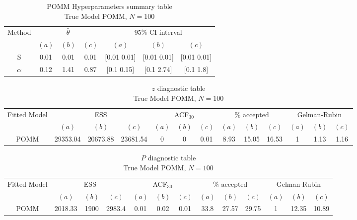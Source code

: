 \documentclass[11pt]{amsart}
\begin{document}
\begin{table}[htbp]
\centering
\caption*{
{\large POMM Hyperparameters summary table} \\ 
{\small True Model POMM, $N=100$}
} 
\begin{tabular}{ccccccc}
\toprule
\multirow{2}{*}{Method} & \multicolumn{3}{c}{
$\hat{\theta}$} & \multicolumn{3}{c}{
95$\%$ CI interval}  \\
\cmidrule(lr){2-4} \cmidrule(lr){5-7} 
& $(a)$ & $(b)$ & $(c)$ & $(a)$ & $(b)$ & $(c)$  \\
\midrule
S  &0.01 & 0.01 & 0.01 & [0.01	0.01] & [0.01	0.01] & [0.01	0.01]   \\
$\alpha$ & 0.12 & 1.41 & 0.87 & [0.1	0.15] & [0.1	2.74] & [0.1	1.8] \\
\bottomrule
\end{tabular}
\label{table:simulations_from_simple}
\end{table}








\begin{table}[htbp]
\centering
\caption*{
{\large $z$ diagnostic table} \\ 
{\small True Model POMM, $N=100$}
} 
\begin{tabular}{ccccccccccccc}
\toprule
\multirow{2}{*}{Fitted Model} & \multicolumn{3}{c}{ESS} & \multicolumn{3}{c}{
ACF$_{30}$} & \multicolumn{3}{c}{$\%$ accepted} & \multicolumn{3}{c}{Gelman-Rubin}\\
\cmidrule(lr){2-4} \cmidrule(lr){5-7} \cmidrule(lr){8-10} \cmidrule(lr){11-13} 
& $(a)$ & $(b)$ & $(c)$ & $(a)$ & $(b)$ & $(c)$ & $(a)$ & $(b)$ & $(c)$ & $(a)$ & $(b)$ & $(c)$ \\
\midrule
POMM &29353.04 & 20673.88 & 23681.54 & 0 & 0 & 0.01 & 8.93 & 15.05  & 16.53 & 1 & 1.13 & 1.16    \\
\bottomrule
\end{tabular}
\label{table:simulations_from_simple}
\end{table}

\begin{table}[htbp]
\centering
\caption*{
{\large $P$ diagnostic table} \\ 
{\small True Model POMM, $N=100$}
} 
\begin{tabular}{ccccccccccccc}
\toprule
\multirow{2}{*}{Fitted Model} & \multicolumn{3}{c}{ESS} & \multicolumn{3}{c}{
ACF$_{30}$} & \multicolumn{3}{c}{$\%$ accepted} & \multicolumn{3}{c}{Gelman-Rubin}\\
\cmidrule(lr){2-4} \cmidrule(lr){5-7} \cmidrule(lr){8-10} \cmidrule(lr){11-13} 
& $(a)$ & $(b)$ & $(c)$ & $(a)$ & $(b)$ & $(c)$ & $(a)$ & $(b)$ & $(c)$ & $(a)$ & $(b)$ & $(c)$ \\
\midrule
POMM &2018.33 & 1900 & 2983.4 & 0.01 & 0.02 & 0.01 & 33.8 & 27.57 & 29.75 & 1 & 12.35 & 10.89  \\
\bottomrule
\end{tabular}
\label{table:simulations_from_simple}
\end{table}
\end{document}
